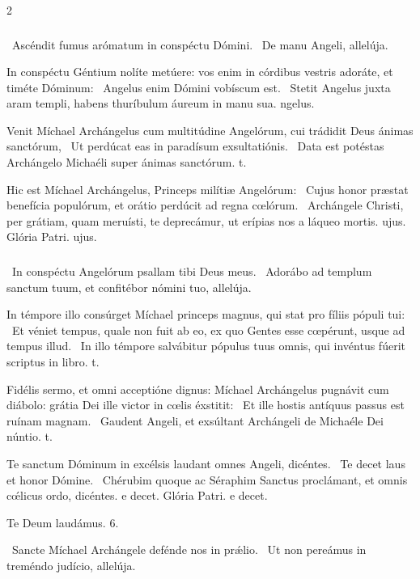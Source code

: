 \documentclass[9pt,twoside]{extarticle}
\begin{document}
\begin{multicols}{2}
\subsubsection*{}
\begin{tightlist}{}
\item {}~Ascéndit fumus arómatum in conspéctu Dómini. ~De manu Angeli, allelúja.
\item {} In conspéctu Géntium nolíte metúere: vos enim in córdibus vestris adoráte, et timéte Dóminum: \textred{*}~Angelus enim Dómini vobíscum est. ~Stetit Angelus juxta aram templi, habens thuríbulum áureum in manu sua. ngelus.
\item {} Venit Míchael Archángelus cum multitúdine Angelórum, cui trádidit Deus ánimas sanctórum, \textred{*}~Ut perdúcat eas in paradísum exsultatiónis. ~Data est potéstas Archángelo Michaéli super ánimas sanctórum. t.
\item {} Hic est Míchael Archángelus, Princeps milítiæ Angelórum: \textred{*}~Cujus honor præstat benefícia populórum, et orátio perdúcit ad regna cœlórum. ~Archángele Christi, per grátiam, quam meruísti, te deprecámur, ut erípias nos a láqueo mortis. ujus. Glória Patri. ujus.
\end{tightlist}

\subsubsection*{}
\begin{tightlist}{}
\item {}~In conspéctu Angelórum psallam tibi Deus meus. ~Adorábo ad templum sanctum tuum, et confitébor nómini tuo, allelúja.
\item {} In témpore illo consúrget Míchael princeps magnus, qui stat pro fíliis pópuli tui: \textred{*}~Et véniet tempus, quale non fuit ab eo, ex quo Gentes esse cœpérunt, usque ad tempus illud. ~In illo témpore salvábitur pópulus tuus omnis, qui invéntus fúerit scriptus in libro. t. 
\item {} Fidélis sermo, et omni acceptióne dignus: Míchael Archángelus pugnávit cum diábolo: grátia Dei ille victor in cœlis éxstitit: \textred{*}~Et ille hostis antíquus passus est ruínam magnam. ~Gaudent Angeli, et exsúltant Archángeli de Michaéle Dei núntio. t.
\item {} Te sanctum Dóminum in excélsis laudant omnes Angeli, dicéntes. \textred{*}~Te decet laus et honor Dómine. ~Chérubim quoque ac Séraphim Sanctus proclámant, et omnis cœ́licus ordo, dicéntes. e decet. Glória Patri. e decet.
\item Te Deum laudámus. 6.
\item {}~Sancte Míchael Archángele defénde nos in prǽlio. ~Ut non pereámus in treméndo judício, allelúja.
\end{tightlist}


\end{multicols}
\end{document}
